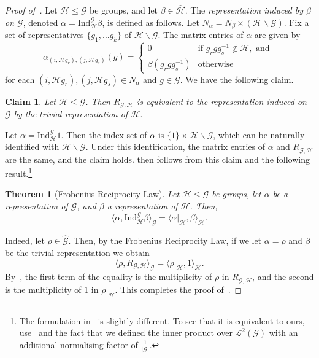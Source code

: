 \documentclass[a4paper,11pt]{article}
\newtheorem{theorem}{Theorem}[section]
\newtheorem*{claim*}{Claim}
\theoremstyle{definition}
\newcommand{\gr}{\mathscr{G}}
\newcommand{\sgr}{\mathscr{H}}
\newcommand{\Ind}{\mathrm{Ind}}
\begin{document}
\begin{proof}[Proof of~]

Let $\sgr \leq \gr$ be groups, and let $\beta\in \widehat{\sgr}$. The \emph{representation induced by $\beta$ on $\gr$}, denoted 
$\alpha= \Ind_{\sgr}^\gr \beta$, is defined as follows.
Let $N_\alpha = N_\beta \times (\sgr \backslash \gr)$. Fix a set of representatives $\{ g_1,\dots g_k\}$ of $\sgr \backslash \gr$. 
The matrix entries of $\alpha$ are given by 
\[
\alpha_{(i, \sgr g_r), (j,\sgr g_s)}(g)= \begin{cases}
    0 & \text{if } g_r g g_s^{-1} \not\in \sgr, \text{ and } \\
    \beta(g_r g g_s^{-1}) &\text{otherwise }
\end{cases}
\]
for each $(i, \sgr g_r), (j,\sgr g_s)\in N_\alpha$ and $ g\in \gr$.
%
We have the following claim.

\begin{claim*}
    Let $\sgr \leq \gr$. Then $R_{\gr,\sgr}$ is equivalent to the representation induced on $\gr$ by the trivial representation of $\sgr$.
\end{claim*}
Let $\alpha= \Ind_\sgr^\gr 1$. Then the index set of $\alpha$ is $\{1\} \times
  \sgr \backslash \gr$, which can be naturally identified with $\sgr \backslash
  \gr$. Under this identification, the matrix entries of $\alpha$ and
  $R_{\gr,\sgr}$ are the same, and the claim holds.
%
 then follows from this claim and the
  following result.\footnote{The formulation in~\cite{Terras_1999} is slightly different. To see that it is equivalent to ours, use~\cite[Proposition 3.2]{Terras_1999} and the fact that we defined the inner product over $\mathcal{L}^2(\gr)$ with an additional normalising factor of $\frac{1}{|\gr|}$.}

\begin{theorem}[Frobenius Reciprocity Law]
Let $\sgr \leq \gr$ be groups, let $\alpha$ be a representation of $\gr$, and $\beta$ a representation of $\sgr$. Then,
\[
\langle 
\alpha, \Ind_{\sgr}^\gr \beta
\rangle_{\gr} =
\langle \alpha\vert_\sgr, \beta \rangle_{\sgr}.
\]
\end{theorem}

Indeed, let $\rho\in \widehat{\gr}$. Then, by the Frobenius Reciprocity Law, if we let $\alpha=\rho$ and $\beta$ be the trivial representation we obtain
\[
\langle 
\rho, R_{\gr,\sgr}
\rangle_{\gr} =
\langle \rho\vert_\sgr, 1 \rangle_{\sgr}.
\]
By~,
the first term of the equality is the multiplicity of $\rho$ in $R_{\gr,\sgr}$,
  and the second is the multiplicity of $1$ in $\rho\vert_\sgr$.
  This completes
  the proof of~.
\end{proof}
\end{document}
